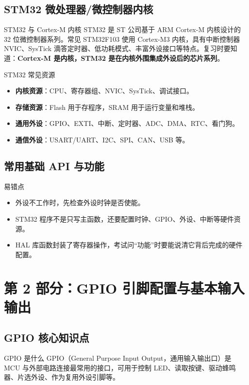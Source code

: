 \documentclass[UTF8,fontset=none,12pt]{ctexart}
\begin{document}
\subsection{STM32 微处理器/微控制器内核}
\begin{pointbox}{STM32 与 Cortex-M 内核}
STM32 是 ST 公司基于 ARM Cortex-M 内核设计的 32 位微控制器系列。常见 STM32F103 使用 Cortex-M3 内核，具有中断控制器 NVIC、SysTick 滴答定时器、低功耗模式、丰富外设接口等特点。复习时要知道：\textbf{Cortex-M 是内核，STM32 是在内核外围集成外设后的芯片系列}。
\end{pointbox}

\begin{pointbox}{STM32 常见资源}
\begin{itemize}
  \item \textbf{内核资源}：CPU、寄存器组、NVIC、SysTick、调试接口。
  \item \textbf{存储资源}：Flash 用于存程序，SRAM 用于运行变量和堆栈。
  \item \textbf{通用外设}：GPIO、EXTI、中断、定时器、ADC、DMA、RTC、看门狗。
  \item \textbf{通信外设}：USART/UART、I2C、SPI、CAN、USB 等。
\end{itemize}
\end{pointbox}

\subsection{常用基础 API 与功能}

\begin{warnbox}{易错点}
\begin{itemize}
  \item 外设不工作时，先检查外设时钟是否使能。
  \item STM32 程序不是只写主函数，还要配置时钟、GPIO、外设、中断等硬件资源。
  \item HAL 库函数封装了寄存器操作，考试问“功能”时要能说清它背后完成的硬件配置。
\end{itemize}
\end{warnbox}

\section{第 2 部分：GPIO 引脚配置与基本输入输出}

\subsection{GPIO 核心知识点}
\begin{pointbox}{GPIO 是什么}
GPIO（General Purpose Input Output，通用输入输出口）是 MCU 与外部电路连接最常用的接口，可用于控制 LED、读取按键、驱动蜂鸣器、片选外设、作为复用外设引脚等。
\end{pointbox}
\end{document}
